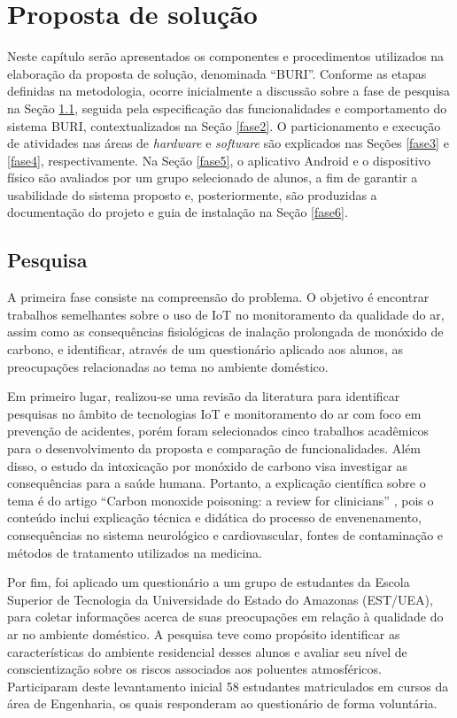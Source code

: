 \chapter{Proposta de solução}

Neste capítulo serão apresentados os componentes e procedimentos utilizados na elaboração da proposta de solução, denominada ``BURI''. Conforme as
etapas definidas na metodologia, ocorre inicialmente a discussão sobre a fase de pesquisa na Seção \ref{fase1}, seguida pela especificação 
das funcionalidades e comportamento do sistema BURI, contextualizados na Seção \ref{fase2}. O particionamento e execução de atividades nas áreas de 
\textit{hardware} e \textit{software} são explicados nas Seções \ref{fase3} e \ref{fase4}, respectivamente. Na Seção \ref{fase5},  o aplicativo Android e o 
dispositivo físico são avaliados por um grupo selecionado de alunos, a fim de garantir a usabilidade do sistema proposto e, posteriormente, são produzidas a documentação 
do projeto e guia de instalação na Seção \ref{fase6}. 

\section{Pesquisa}\label{fase1}

A primeira fase consiste na compreensão do problema. O objetivo é encontrar trabalhos semelhantes sobre o uso de IoT no monitoramento da qualidade do ar, assim 
como as consequências fisiológicas de inalação prolongada de monóxido de carbono, e identificar, através de um questionário aplicado aos alunos, as preocupações relacionadas 
ao tema no ambiente doméstico.

Em primeiro lugar, realizou-se uma revisão da literatura para identificar pesquisas no âmbito de tecnologias IoT e monitoramento do ar com foco 
em prevenção de acidentes, porém foram selecionados cinco trabalhos acadêmicos para o desenvolvimento da proposta e comparação de funcionalidades. 
Além disso, o estudo da intoxicação por monóxido de carbono visa investigar as consequências para a saúde humana. Portanto, a explicação científica sobre o tema é do 
artigo ``Carbon monoxide poisoning: a review for clinicians'' \cite{carbon-monoxide-poisoning-varon}, pois o conteúdo inclui 
explicação técnica e didática do processo de envenenamento, consequências no sistema neurológico e cardiovascular, fontes de contaminação e métodos de tratamento utilizados na medicina.

Por fim, foi aplicado um questionário a um grupo de estudantes da Escola Superior de Tecnologia da Universidade do Estado do Amazonas (EST/UEA), para coletar informações acerca de suas
preocupações em relação à qualidade do ar no ambiente doméstico. A pesquisa teve como propósito identificar as características do ambiente residencial desses alunos e avaliar seu 
nível de conscientização sobre os riscos associados aos poluentes atmosféricos. Participaram deste levantamento inicial 58 estudantes matriculados em cursos da área de Engenharia, os quais responderam 
ao questionário de forma voluntária.

